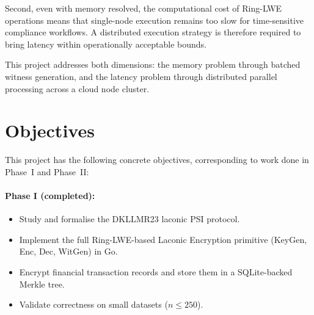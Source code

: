 Second, even with memory resolved, the computational cost of Ring-LWE operations means
that single-node execution remains too slow for time-sensitive compliance workflows.
A distributed execution strategy is therefore required to bring latency within
operationally acceptable bounds.

This project addresses both dimensions: the memory problem through batched witness
generation, and the latency problem through distributed parallel processing across a
cloud node cluster.

\section{Objectives}

This project has the following concrete objectives, corresponding to work done in
Phase~I and Phase~II:

\paragraph{Phase I (completed):}
\begin{itemize}
    \item Study and formalise the DKLLMR23 laconic PSI protocol.
    \item Implement the full Ring-LWE-based Laconic Encryption primitive (KeyGen,
          Enc, Dec, WitGen) in Go.
    \item Encrypt financial transaction records and store them in a SQLite-backed
          Merkle tree.
    \item Validate correctness on small datasets ($n \le 250$).
\end{itemize}

